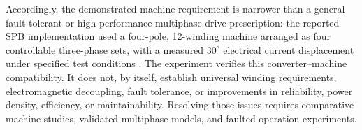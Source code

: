 Accordingly, the demonstrated machine requirement is narrower than a general fault-tolerant or high-performance multiphase-drive prescription: the reported SPB implementation used a four-pole, 12-winding machine arranged as four controllable three-phase sets, with a measured $30^{\circ}$ electrical current displacement under specified test conditions \cite{Jin2017}. The experiment verifies this converter--machine compatibility. It does not, by itself, establish universal winding requirements, electromagnetic decoupling, fault tolerance, or improvements in reliability, power density, efficiency, or maintainability. Resolving those issues requires comparative machine studies, validated multiphase models, and faulted-operation experiments. %